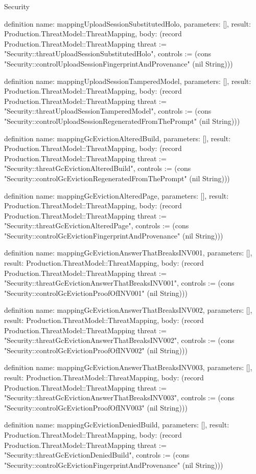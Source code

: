 \begin{lexlean}{Security}
\begin{semanticmodule}
definition{
  name: mappingUploadSessionSubstitutedHolo,
  parameters: [],
  result: Production.ThreatModel::ThreatMapping,
  body: (record Production.ThreatModel::ThreatMapping {threat := "Security::threatUploadSessionSubstitutedHolo", controls := (cons "Security::controlUploadSessionFingerprintAndProvenance" (nil String))})
}

definition{
  name: mappingUploadSessionTamperedModel,
  parameters: [],
  result: Production.ThreatModel::ThreatMapping,
  body: (record Production.ThreatModel::ThreatMapping {threat := "Security::threatUploadSessionTamperedModel", controls := (cons "Security::controlUploadSessionRegeneratedFromThePrompt" (nil String))})
}

definition{
  name: mappingGcEvictionAlteredBuild,
  parameters: [],
  result: Production.ThreatModel::ThreatMapping,
  body: (record Production.ThreatModel::ThreatMapping {threat := "Security::threatGcEvictionAlteredBuild", controls := (cons "Security::controlGcEvictionRegeneratedFromThePrompt" (nil String))})
}

definition{
  name: mappingGcEvictionAlteredPage,
  parameters: [],
  result: Production.ThreatModel::ThreatMapping,
  body: (record Production.ThreatModel::ThreatMapping {threat := "Security::threatGcEvictionAlteredPage", controls := (cons "Security::controlGcEvictionFingerprintAndProvenance" (nil String))})
}

definition{
  name: mappingGcEvictionAnswerThatBreaksINV001,
  parameters: [],
  result: Production.ThreatModel::ThreatMapping,
  body: (record Production.ThreatModel::ThreatMapping {threat := "Security::threatGcEvictionAnswerThatBreaksINV001", controls := (cons "Security::controlGcEvictionProofOfINV001" (nil String))})
}

definition{
  name: mappingGcEvictionAnswerThatBreaksINV002,
  parameters: [],
  result: Production.ThreatModel::ThreatMapping,
  body: (record Production.ThreatModel::ThreatMapping {threat := "Security::threatGcEvictionAnswerThatBreaksINV002", controls := (cons "Security::controlGcEvictionProofOfINV002" (nil String))})
}

definition{
  name: mappingGcEvictionAnswerThatBreaksINV003,
  parameters: [],
  result: Production.ThreatModel::ThreatMapping,
  body: (record Production.ThreatModel::ThreatMapping {threat := "Security::threatGcEvictionAnswerThatBreaksINV003", controls := (cons "Security::controlGcEvictionProofOfINV003" (nil String))})
}

definition{
  name: mappingGcEvictionDeniedBuild,
  parameters: [],
  result: Production.ThreatModel::ThreatMapping,
  body: (record Production.ThreatModel::ThreatMapping {threat := "Security::threatGcEvictionDeniedBuild", controls := (cons "Security::controlGcEvictionFingerprintAndProvenance" (nil String))})
}


\end{semanticmodule}
\end{lexlean}
